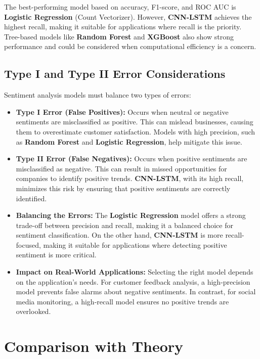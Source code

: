 The best-performing model based on accuracy, F1-score, and ROC AUC is \textbf{Logistic Regression} (Count Vectorizer). However, \textbf{CNN-LSTM} achieves the highest recall, making it suitable for applications where recall is the priority. Tree-based models like \textbf{Random Forest} and \textbf{XGBoost} also show strong performance and could be considered when computational efficiency is a concern.

\subsection{Type I and Type II Error Considerations}

Sentiment analysis models must balance two types of errors:

\begin{itemize}
    \item \textbf{Type I Error (False Positives):} Occurs when neutral or negative sentiments are misclassified as positive. This can mislead businesses, causing them to overestimate customer satisfaction. Models with high precision, such as \textbf{Random Forest} and \textbf{Logistic Regression}, help mitigate this issue.
    
    \item \textbf{Type II Error (False Negatives):} Occurs when positive sentiments are misclassified as negative. This can result in missed opportunities for companies to identify positive trends. \textbf{CNN-LSTM}, with its high recall, minimizes this risk by ensuring that positive sentiments are correctly identified.
    
    \item \textbf{Balancing the Errors:} The \textbf{Logistic Regression} model offers a strong trade-off between precision and recall, making it a balanced choice for sentiment classification. On the other hand, \textbf{CNN-LSTM} is more recall-focused, making it suitable for applications where detecting positive sentiment is more critical.
    
    \item \textbf{Impact on Real-World Applications:} Selecting the right model depends on the application's needs. For customer feedback analysis, a high-precision model prevents false alarms about negative sentiments. In contrast, for social media monitoring, a high-recall model ensures no positive trends are overlooked.
\end{itemize}

\section{Comparison with Theory}

